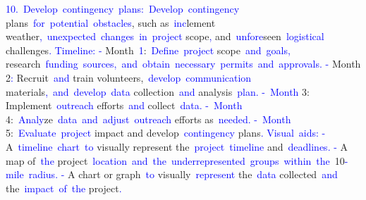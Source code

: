 \documentclass{article}
\begin{document}
\begin{tcolorbox}[colframe=black,colback=white]
{}\textcolor{blue}{10}\textcolor{blue}{.}\textcolor{blue}{~Develop}\textcolor{blue}{~contingency}\textcolor{blue}{~plans}\textcolor{blue}{:}\textcolor{blue}{~Develop}\textcolor{blue}{~contingency} plans\textcolor{blue}{~for}\textcolor{blue}{~potential}\textcolor{blue}{~obstacles}, such as\textcolor{blue}{~inc}lement weather\textcolor{blue}{,}\textcolor{blue}{~unexpected}\textcolor{blue}{~changes}\textcolor{blue}{~in}\textcolor{blue}{~project} scope\textcolor{blue}{,} and\textcolor{blue}{~unfore}seen\textcolor{blue}{~logistical} challenges\textcolor{blue}{.
}\textcolor{blue}{Timeline}\textcolor{blue}{:
}\textcolor{blue}{-} Month\textcolor{blue}{~}\textcolor{blue}{1}:\textcolor{blue}{~Define}\textcolor{blue}{~project} scope\textcolor{blue}{~and}\textcolor{blue}{~goals}\textcolor{blue}{,} research\textcolor{blue}{~funding}\textcolor{blue}{~sources}\textcolor{blue}{,}\textcolor{blue}{~and}\textcolor{blue}{~obtain}\textcolor{blue}{~necessary}\textcolor{blue}{~permits}\textcolor{blue}{~and}\textcolor{blue}{~approvals}\textcolor{blue}{.
}\textcolor{blue}{-} Month 2\textcolor{blue}{:} Recruit\textcolor{blue}{~and} train volunteers,\textcolor{blue}{~develop}\textcolor{blue}{~communication} materials\textcolor{blue}{,}\textcolor{blue}{~and}\textcolor{blue}{~develop}\textcolor{blue}{~data} collection\textcolor{blue}{~and} analysis\textcolor{blue}{~plan}\textcolor{blue}{.
}\textcolor{blue}{-}\textcolor{blue}{~Month} 3: Implement\textcolor{blue}{~outreach} efforts\textcolor{blue}{~and} collect\textcolor{blue}{~data}\textcolor{blue}{.
}\textcolor{blue}{-}\textcolor{blue}{~Month} 4:\textcolor{blue}{~Analy}ze\textcolor{blue}{~data}\textcolor{blue}{~and}\textcolor{blue}{~adjust}\textcolor{blue}{~outreach} efforts as\textcolor{blue}{~needed}\textcolor{blue}{.
}\textcolor{blue}{-}\textcolor{blue}{~Month} 5:\textcolor{blue}{~Evaluate}\textcolor{blue}{~project} impact and develop\textcolor{blue}{~contingency} plans\textcolor{blue}{.
}\textcolor{blue}{Visual}\textcolor{blue}{~aids}\textcolor{blue}{:
}\textcolor{blue}{-} A\textcolor{blue}{~timeline}\textcolor{blue}{~chart}\textcolor{blue}{~to} visually represent the\textcolor{blue}{~project}\textcolor{blue}{~timeline} and\textcolor{blue}{~deadlines}\textcolor{blue}{.
}\textcolor{blue}{-} A map of\textcolor{blue}{~the} project\textcolor{blue}{~location}\textcolor{blue}{~and}\textcolor{blue}{~the}\textcolor{blue}{~under}\textcolor{blue}{represented}\textcolor{blue}{~groups}\textcolor{blue}{~within}\textcolor{blue}{~the}\textcolor{blue}{~}10\textcolor{blue}{-mile}\textcolor{blue}{~radius}\textcolor{blue}{.
}\textcolor{blue}{-} A chart or graph\textcolor{blue}{~to} visually\textcolor{blue}{~represent} the\textcolor{blue}{~data} collected\textcolor{blue}{~and} the\textcolor{blue}{~impact}\textcolor{blue}{~of}\textcolor{blue}{~the} project\textcolor{blue}{.}\textcolor{blue}{}
\end{tcolorbox}
\end{document}
